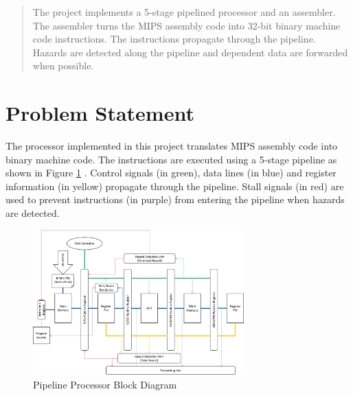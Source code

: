 \documentclass[conference]{IEEEtran}
\begin{document}




\maketitle


\begin{abstract}
The project implements a 5-stage pipelined processor and an assembler. The assembler turns the MIPS assembly code into 32-bit binary machine code instructions. The instructions propagate through the pipeline. Hazards are detected along the pipeline and dependent data are forwarded when possible.
\end{abstract}





%
\IEEEpeerreviewmaketitle



\section{Problem Statement}

The processor implemented in this project translates MIPS assembly code into binary machine code. The instructions are executed using a 5-stage pipeline as shown in Figure \ref{pipelineBD} \cite{compOrg}. Control signals (in green), data lines (in blue) and register information (in yellow) propagate through the pipeline. Stall signals (in red) are used to prevent instructions (in purple) from entering the pipeline when hazards are detected.

\begin{figure}[!h]
\centering
\includegraphics[width=3.2in]{Figures/pipeline}
\caption{Pipeline Processor Block Diagram}
\label{pipelineBD}
\end{figure}
\end{document}
